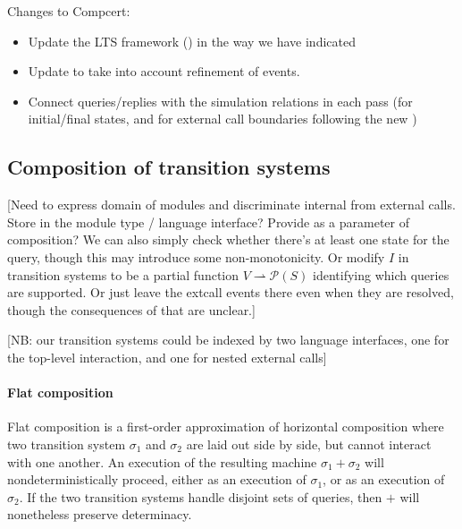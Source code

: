Changes to Compcert:
\begin{itemize}
\item Update the LTS framework ()
  in the way we have indicated
\item Update  to take into account
  refinement of events.
\item Connect queries/replies
  with the simulation relations in each pass
  (for initial/final states, and for external call boundaries
  following the new )
\end{itemize}  


\subsection{Composition of transition systems} %

[Need to express domain of modules and discriminate
internal from external calls.
Store in the module type / language interface?
Provide as a parameter of composition?
We can also simply check whether there's at least
one state for the query,
though this may introduce some non-monotonicity.
Or modify $I$ in transition systems
to be a partial function $V \rightharpoonup \mathcal{P}(S)$
identifying which queries are supported.
Or just leave the extcall events there even when
they are resolved,
though the consequences of that are unclear.]

[NB: our transition systems could be indexed by two language interfaces,
one for the top-level interaction, and one for nested external calls]

\paragraph{Flat composition} %

Flat composition
is a first-order approximation of horizontal composition
where two transition system $\sigma_1$ and $\sigma_2$
are laid out side by side,
but cannot interact with one another.
An execution of the resulting machine $\sigma_1 + \sigma_2$
will nondeterministically proceed,
either as an execution of $\sigma_1$,
or as an execution of $\sigma_2$.
If the two transition systems
handle disjoint sets of queries,
then $+$ will nonetheless preserve determinacy.

